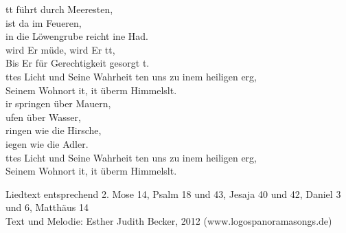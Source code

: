 
tt führt durch Meeresten,\\
 ist da im Feueren,\\
 in die Löwengrube reicht ine Had.\\
 wird Er müde,  wird Er tt,\\
Bis Er für Gerechtigkeit gesorgt t.\\

ttes Licht und Seine Wahrheit ten uns zu inem heiligen erg,\\
 Seinem Wohnort it, it überm Himmelslt.\\

ir springen über Mauern,\\
ufen über Wasser,\\
ringen wie die Hirsche,\\
iegen wie die Adler.\\

ttes Licht und Seine Wahrheit ten uns zu inem heiligen erg,\\
 Seinem Wohnort it, it überm Himmelslt.\\

\begin{footnotesize}
Liedtext entsprechend 2. Mose 14, Psalm 18 und 43, Jesaja 40 und 42, Daniel 3 und 6, Matthäus 14\\
Text und Melodie: Esther Judith Becker, 2012 (www.logospanoramasongs.de)
\end{footnotesize}